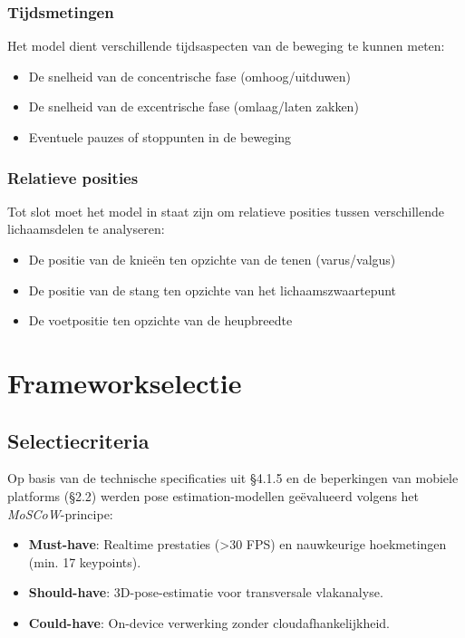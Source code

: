 \subsubsection{Tijdsmetingen}
Het model dient verschillende tijdsaspecten van de beweging te kunnen meten:
\begin{itemize}
    \item De snelheid van de concentrische fase (omhoog/uitduwen)
    \item De snelheid van de excentrische fase (omlaag/laten zakken)
    \item Eventuele pauzes of stoppunten in de beweging
\end{itemize}

\subsubsection{Relatieve posities}
Tot slot moet het model in staat zijn om relatieve posities tussen verschillende lichaamsdelen te analyseren:
\begin{itemize}
    \item De positie van de knieën ten opzichte van de tenen (varus/valgus)
    \item De positie van de stang ten opzichte van het lichaamszwaartepunt
    \item De voetpositie ten opzichte van de heupbreedte
\end{itemize}

\section{Frameworkselectie}
\subsection{Selectiecriteria}

Op basis van de technische specificaties uit §4.1.5 en de beperkingen van mobiele platforms (§2.2) werden pose estimation-modellen geëvalueerd volgens het \textit{MoSCoW}-principe:

\begin{itemize}
\item \textbf{Must-have}: Realtime prestaties (>30 FPS) en nauwkeurige hoekmetingen (min. 17 keypoints).
\item \textbf{Should-have}: 3D-pose-estimatie voor transversale vlakanalyse.
\item \textbf{Could-have}: On-device verwerking zonder cloudafhankelijkheid.
\end{itemize}

